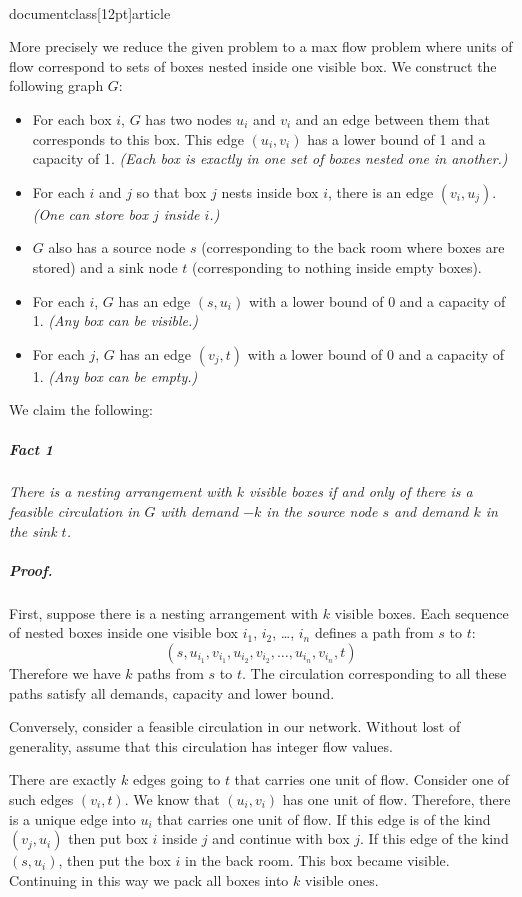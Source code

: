 \\documentclass[12pt]{article}
\begin{document}
\begin{enumerate}
{More precisely we reduce the given problem to a max flow problem
where units of flow correspond to sets of boxes nested
inside one visible box.
We construct the following graph $G$:
\begin{itemize}
\item For each box $i$, $G$ has two nodes $u_i$ and $v_i$
  and an edge between them that corresponds to this box.
  This edge $(u_i,v_i)$ has a lower bound of 1 and a capacity of 1.
  {\em (Each box is exactly in one set of boxes nested one
  in another.)}
\item For each $i$ and $j$ so that box $j$ nests inside box $i$,
  there is an edge $(v_i,u_j)$.
  {\em (One can store box $j$ inside $i$.)}
\item $G$ also has a source node $s$ (corresponding to the back room where
  boxes are stored) and a sink node $t$ (corresponding to nothing inside
  empty boxes).
\item For each $i$, $G$ has an edge $(s,u_i)$ with a lower bound of 0 and a
  capacity of 1.
  {\em (Any box can be visible.)}
\item For each $j$, $G$ has an edge $(v_j,t)$ with a lower bound of 0 and a
  capacity of 1.
  {\em (Any box can be empty.)}
\end{itemize}


We claim the following:
\subparagraph {Fact 1}
{\em There is a nesting arrangement with $k$ visible boxes if and only of
  there is a feasible circulation in $G$ with demand $-k$ in the source node
  $s$ and demand $k$ in the sink $t$.
}


\subparagraph{Proof.}
First, suppose there is a nesting arrangement with $k$ visible boxes.
Each sequence of nested boxes inside one visible box $i_1$, $i_2$, \dots, $i_n$
defines a path from $s$ to $t$:
$$(s,u_{i_1},v_{i_1},u_{i_2},v_{i_2},\dots,u_{i_n},v_{i_n},t)$$
Therefore we have $k$ paths from $s$ to $t$.
The circulation corresponding to all these paths satisfy all demands,
capacity and lower bound.

Conversely, consider a feasible circulation in our network.
Without lost of generality, assume that this circulation has
integer flow values.

There are exactly $k$ edges going to $t$ that carries one unit of flow.
Consider one of such edges $(v_i,t)$.
We know that $(u_i,v_i)$ has one unit of flow.
Therefore, there is a unique edge into $u_i$ that carries one unit of flow.
If this edge is of the kind $(v_j,u_i)$ then put box $i$ inside $j$ and
continue with box $j$.
If this edge of the kind $(s,u_i)$, then put the box $i$ in the back room.
This box became visible.
Continuing in this way we pack all boxes into $k$ visible ones.

}
\end{enumerate}
\end{document}
